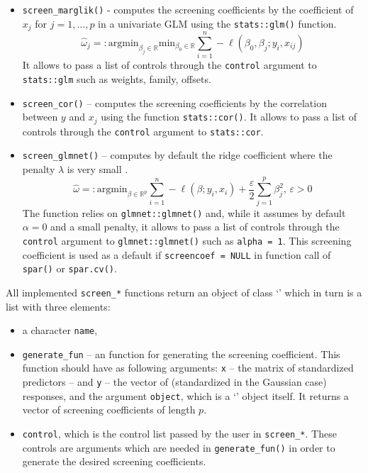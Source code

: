 \documentclass[
  article]{jss}
\newcommand{\class}[1]{`\code{#1}'}
\begin{document}
\begin{itemize}
\item
  \texttt{screen\_marglik()} - computes the screening coefficients by
  the coefficient of \(x_j\) for \(j =1,\dots,p\) in a univariate GLM
  using the \texttt{stats::glm()} function. \[
   \hat\omega_j=:\text{argmin}_{\beta_j\in \mathbb{R}}\text{min}_{{\beta_0}\in\mathbb{R}}\sum_{i=1}^n -\ell(\beta_0,\beta_j;y_i,x_{ij})
   \] It allows to pass a list of controls through the \texttt{control}
  argument to \texttt{stats::glm} such as weights, family, offsets.
\item
  \texttt{screen\_cor()} -- computes the screening coefficients by the
  correlation between \(y\) and \(x_j\) using the function
  \texttt{stats::cor()}. It allows to pass a list of controls through
  the \texttt{control} argument to \texttt{stats::cor}.
\item
  \texttt{screen\_glmnet()} -- computes by default the ridge coefficient
  where the penalty \(\lambda\) is very small \citep[see][ for
  clarification]{parzer2024glms}. \[
  \hat\omega=: \text{argmin}_{{\beta}\in\mathbb{R}^p}\sum_{i=1}^n -\ell(\beta;y_i,x_i) + \frac{\varepsilon}{2}\sum_{j=1}^p{\beta}_j^2, \, \varepsilon > 0
  \] The function relies on \texttt{glmnet::glmnet()} and, while it
  assumes by default \(\alpha = 0\) and a small penalty, it allows to
  pass a list of controls through the \texttt{control} argument to
  \texttt{glmnet::glmnet()} such as \texttt{alpha\ =\ 1}. This screening
  coefficient is used as a default if \texttt{screencoef\ =\ NULL} in
  function call of \texttt{spar()} or \texttt{spar.cv()}.
\end{itemize}

All implemented \texttt{screen\_*} functions return an object of class
\class{screencoef} which in turn is a list with three elements:

\begin{itemize}
\item
  a character \texttt{name},
\item
  \texttt{generate\_fun} -- an  function for generating the
  screening coefficient. This function should have as following
  arguments: \texttt{x} -- the matrix of standardized predictors -- and
  \texttt{y} -- the vector of (standardized in the Gaussian case)
  responses, and the argument \texttt{object}, which is a
  \class{screencoef} object itself. It returns a vector of screening
  coefficients of length \(p\).
\item
  \texttt{control}, which is the control list passed by the user in
  \texttt{screen\_*}. These controls are arguments which are needed in
  \texttt{generate\_fun()} in order to generate the desired screening
  coefficients.
\end{itemize}
\end{document}
